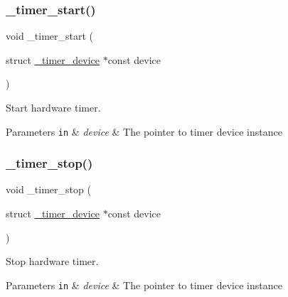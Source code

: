\subsubsection{\texorpdfstring{\+\_\+timer\+\_\+start()}{\_timer\_start()}}
{\footnotesize\ttfamily void \+\_\+timer\+\_\+start (\begin{DoxyParamCaption}\item[{struct \hyperlink{struct__timer__device}{\+\_\+timer\+\_\+device} $\ast$const}]{device }\end{DoxyParamCaption})}



Start hardware timer. 


\begin{DoxyParams}[1]{Parameters}
\mbox{\tt in}  & {\em device} & The pointer to timer device instance \\
\hline
\end{DoxyParams}
\mbox{\label{group___h_p_l_gaf20437ff953c5533299bd9f7d4fabfe4}} 
\subsubsection{\texorpdfstring{\+\_\+timer\+\_\+stop()}{\_timer\_stop()}}
{\footnotesize\ttfamily void \+\_\+timer\+\_\+stop (\begin{DoxyParamCaption}\item[{struct \hyperlink{struct__timer__device}{\+\_\+timer\+\_\+device} $\ast$const}]{device }\end{DoxyParamCaption})}



Stop hardware timer. 


\begin{DoxyParams}[1]{Parameters}
\mbox{\tt in}  & {\em device} & The pointer to timer device instance \\
\hline
\end{DoxyParams}
\mbox{\label{group___h_p_l_gab834a3310b05b1118ac7cf5ad90835ba}} 
